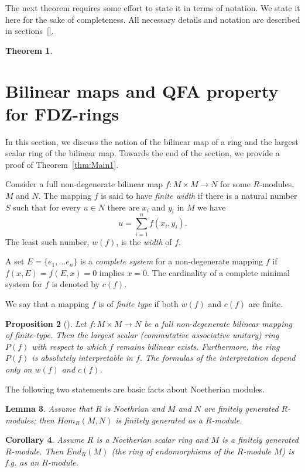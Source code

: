 \documentclass{article}
\newtheorem{theorem}{Theorem}[section]
\newtheorem{lemma}[theorem]{Lemma}
\newtheorem{cor}[theorem]{Corollary}
\newtheorem{prop}[theorem]{Proposition}
\theoremstyle{remark}
\begin{document}
The next theorem requires some effort to state it in terms of notation. We state it here for the sake of completeness. All necessary details and notation are described in sections~\ref{}.  
\begin{theorem} 

\end{theorem}\fi

\section{Bilinear maps and QFA property for FDZ-rings}\label{sec:bilin}
In this section, we discuss the notion of the bilinear map of a ring and the largest scalar ring of the bilinear
map. Towards the end of the section, we provide a proof of Theorem~\ref{thm:Main1}.

Consider a full non-degenerate bilinear map $f:M\times M \to N$ for some $R$-modules, $M$ and $N$. The mapping $f$ is said to have \textit{finite width} if there is a natural number $S$ such that for every $u\in
N$ there are $x_i$ and $y_i$ in $M$ we have
$$u=\sum_{i=1}^nf(x_i,y_i).$$
The least such number, $w(f)$, is the \textit{width} of $f$.

A set $E=\{e_1,\ldots e_n\}$ is a \textit{complete system} for a non-degenerate mapping $f$ if $f(x,E)=f(E,x)=0$ implies $x=0$. The
cardinality of a complete minimal system for $f$ is denoted by $c(f)$.

We say that a mapping $f$ is of \emph{finite type} if both $w(f)$ and $c(f)$ are finite.

\begin{prop}[\cite{alexei86, alexei91}]\label{myasnik:bilinT} Let $f:M\times M \to N$ be a full non-degenerate bilinear mapping of finite-type. Then the largest scalar (commutative associative unitary) ring $P(f)$ with respect to which $f$ remains bilinear exists. Furthermore, the ring $P(f)$ is absolutely interpretable in $f$. The formulas of the interpretation depend only on $w(f)$ and $c(f)$. \end{prop}

The following two statements are basic facts  about Noetherian modules.
\begin{lemma}\label{f.g.module:lem} Assume that $R$ is Noethrian and $M$ and $N$ are finitely generated $R$-modules; then $Hom_R(M,N)$ is finitely generated as a $R$-module.\end{lemma}

\begin{cor}Assume $R$ is a Noetherian scalar ring and $M$ is a finitely generated $R$-module. Then $End_R(M)$ (the ring of endomorphisms of the $R$-module $M$) is f.g. as an $R$-module.\end{cor}
\end{document}
